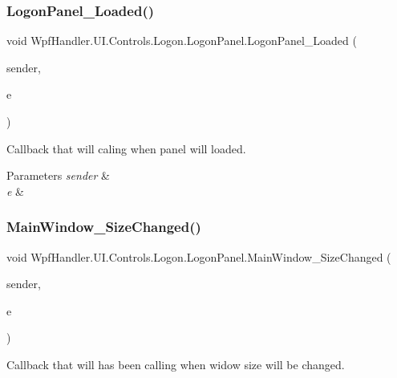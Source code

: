 \subsubsection{\texorpdfstring{Logon\+Panel\+\_\+\+Loaded()}{LogonPanel\_Loaded()}}
{\footnotesize\ttfamily void Wpf\+Handler.\+U\+I.\+Controls.\+Logon.\+Logon\+Panel.\+Logon\+Panel\+\_\+\+Loaded (\begin{DoxyParamCaption}\item[{object}]{sender,  }\item[{Routed\+Event\+Args}]{e }\end{DoxyParamCaption})\hspace{0.3cm}{\ttfamily [private]}}



Callback that will caling when panel will loaded. 


\begin{DoxyParams}{Parameters}
{\em sender} & \\
\hline
{\em e} & \\
\hline
\end{DoxyParams}
\mbox{\label{class_wpf_handler_1_1_u_i_1_1_controls_1_1_logon_1_1_logon_panel_a4f72805700420f21360f6d5ffa5c57e0}} 
\subsubsection{\texorpdfstring{Main\+Window\+\_\+\+Size\+Changed()}{MainWindow\_SizeChanged()}}
{\footnotesize\ttfamily void Wpf\+Handler.\+U\+I.\+Controls.\+Logon.\+Logon\+Panel.\+Main\+Window\+\_\+\+Size\+Changed (\begin{DoxyParamCaption}\item[{object}]{sender,  }\item[{Size\+Changed\+Event\+Args}]{e }\end{DoxyParamCaption})\hspace{0.3cm}{\ttfamily [private]}}



Callback that will has been calling when widow size will be changed. 


